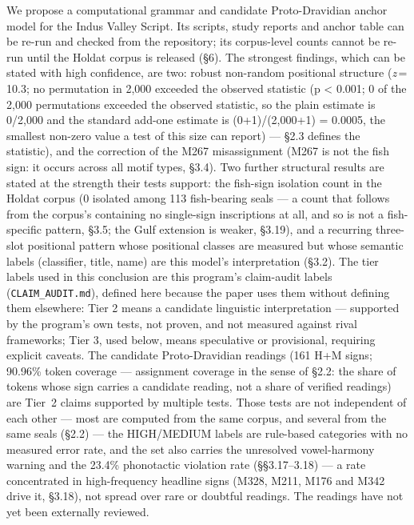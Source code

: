 \documentclass[11pt]{article}
\begin{document}
We propose a computational grammar and candidate Proto-Dravidian anchor
model for the Indus Valley Script. Its scripts, study reports and anchor
table can be re-run and checked from the repository; its corpus-level
counts cannot be re-run until the Holdat corpus is released (§6). The strongest findings, which can be stated with high confidence, are two: robust non-random positional structure (\textit{z}\,=\,10.3; no permutation in 2,000 exceeded the observed statistic (p \textless{} 0.001; 0 of the 2,000 permutations exceeded the observed statistic, so the plain estimate is 0/2,000 and the standard add-one estimate is (0+1)/(2,000+1) = 0.0005, the smallest non-zero value a test of this size can report) --- §2.3 defines the statistic), and the correction of the M267 misassignment (M267 is not the fish sign: it occurs across all motif types, §3.4). Two further structural results are stated at the strength their tests support: the fish-sign isolation count in the Holdat corpus (0 isolated among 113 fish-bearing seals --- a count that follows from the corpus's containing no single-sign inscriptions at all, and so is not a fish-specific pattern, §3.5; the Gulf extension is weaker, §3.19), and a recurring three-slot positional pattern whose positional classes are measured but whose semantic labels (classifier, title, name) are this model's interpretation (§3.2). The tier labels used in this conclusion are this program's claim-audit labels (\texttt{CLAIM\_AUDIT.md}), defined here because the paper uses them without defining them elsewhere: Tier 2 means a candidate linguistic interpretation --- supported by the program's own tests, not proven, and not measured against rival frameworks; Tier 3, used below, means speculative or provisional, requiring explicit caveats. The candidate Proto-Dravidian readings (161 H+M signs; 90.96\% token coverage --- assignment coverage in the sense of §2.2: the share of tokens whose sign carries a candidate reading, not a share of verified readings) are Tier~2 claims supported by multiple tests. Those tests are not independent of each other --- most are computed from the same corpus, and several from the same seals (§2.2) --- the HIGH/MEDIUM labels are rule-based categories with no measured error rate, and the set also carries the unresolved vowel-harmony warning and the 23.4\% phonotactic violation rate (§§3.17--3.18) --- a rate concentrated in high-frequency headline signs (M328, M211, M176 and M342 drive it, §3.18), not spread over rare or doubtful readings. The readings have not yet been externally reviewed.
\end{document}
